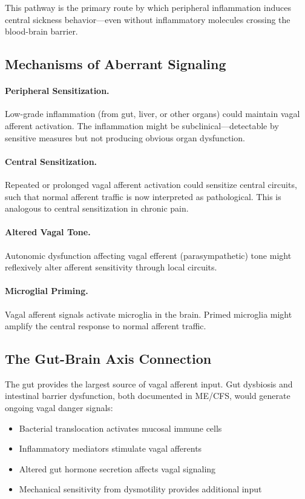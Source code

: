 This pathway is the primary route by which peripheral inflammation induces central sickness behavior---even without inflammatory molecules crossing the blood-brain barrier.

\subsection{Mechanisms of Aberrant Signaling}

\paragraph{Peripheral Sensitization.} Low-grade inflammation (from gut, liver, or other organs) could maintain vagal afferent activation. The inflammation might be subclinical---detectable by sensitive measures but not producing obvious organ dysfunction.

\paragraph{Central Sensitization.} Repeated or prolonged vagal afferent activation could sensitize central circuits, such that normal afferent traffic is now interpreted as pathological. This is analogous to central sensitization in chronic pain.

\paragraph{Altered Vagal Tone.} Autonomic dysfunction affecting vagal efferent (parasympathetic) tone might reflexively alter afferent sensitivity through local circuits.

\paragraph{Microglial Priming.} Vagal afferent signals activate microglia in the brain. Primed microglia might amplify the central response to normal afferent traffic.

\subsection{The Gut-Brain Axis Connection}

The gut provides the largest source of vagal afferent input. Gut dysbiosis and intestinal barrier dysfunction, both documented in ME/CFS, would generate ongoing vagal danger signals:

\begin{itemize}
    \item Bacterial translocation activates mucosal immune cells
    \item Inflammatory mediators stimulate vagal afferents
    \item Altered gut hormone secretion affects vagal signaling
    \item Mechanical sensitivity from dysmotility provides additional input
\end{itemize}


